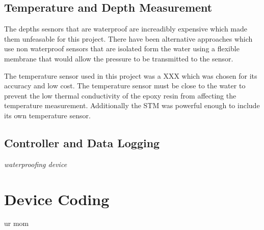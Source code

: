 \subsection{Temperature and Depth Measurement}

The depths sesnors that are waterproof are increadibly expensive which made them unfeasable for this project.
There have been alternative approaches which use non waterproof sensors that are isolated form the water using a flexible membrane that would allow the pressure to be transmitted to the sensor.

The temperature sensor used in this project was a XXX which was chosen for its accuracy and low cost.
The temperature sensor must be close to the water to prevent the low thermal conductivity of the epoxy resin from affecting the temperature measurement.
Additionally the STM was powerful enough to include its own temperature sensor.

\subsection{Controller and Data Logging}
\textit{waterproofing device}

\section{Device Coding}
ur mom

